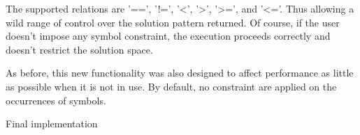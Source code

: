 \documentclass{eplmastersthesis}
\begin{document}
The supported relations are '==', '!=', '<', '>', '>=', and '<='. Thus allowing a wild range of control over the solution pattern returned. Of course, if the user doesn't impose any symbol constraint, the execution proceeds correctly and doesn't restrict the solution space. \newline

As before, this new functionality was also designed to affect performance as little as possible when it is not in use. By default, no constraint are applied on the occurrences of symbols.

\clearpage
{}
\LinesNumbered
\begin{algorithm}[!h]
	\caption{Final implementation}
    \label{alg:FINAL}
    
    

\end{algorithm}
\end{document}
